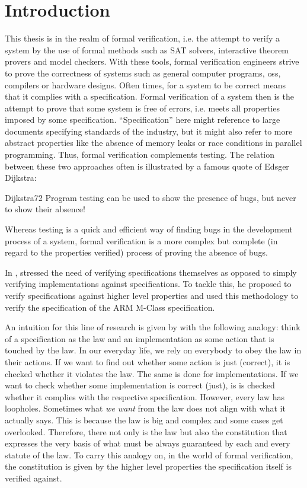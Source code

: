 
\chapter{Introduction}
\label{chp:introduction}

This thesis is in the realm of formal verification, i.e. the attempt to verify a system by the use of formal methods such as SAT solvers, interactive theorem provers and model checkers.
With these tools, formal verification engineers strive to prove the correctness of systems such as general computer programs, \glspl{os}, compilers or hardware designs.
Often times, for a system to be correct means that it complies with a specification.
Formal verification of a system then is the attempt to prove that some system is free of errors, i.e. meets all properties imposed by some specification.
\enquote{Specification} here might reference to large documents specifying standards of the industry, but it might also refer to more abstract properties like the absence of memory leaks or race conditions in parallel programming.
Thus, formal verification complements testing.
The relation between these two approaches often is illustrated by a famous quote of Edsger Dijkstra:
\begin{displaycquote}[p.6]{Dijkstra72}
    Program testing can be used to show the presence of bugs, but never to show their absence!
\end{displaycquote}

Whereas testing is a quick and efficient way of finding bugs in the development process of a system, formal verification is a more complex but complete (in regard to the properties verified) process of proving the absence of bugs.

In  \cite{Reid17}, \citeauthor{Reid17} stressed the need of verifying specifications themselves as opposed to simply verifying implementations against specifications.
To tackle this, he proposed to verify specifications against higher level properties and used this methodology to verify the specification of the ARM M-Class specification.

An intuition for this line of research is given by \citeauthor{Reid17} with the following analogy: think of a specification as the law and an implementation as some action that is touched by the law.
In our everyday life, we rely on everybody to obey the law in their actions.
If we want to find out whether some action is just (correct), it is checked whether it violates the law.
The same is done for implementations.
If we want to check whether some implementation is correct (just), is is checked whether it complies with the respective specification.
However, every law has loopholes.
Sometimes what \textit{we want} from the law does not align with what it actually says.
This is because the law is big and complex and some cases get overlooked.
Therefore, there not only is the law but also the constitution that expresses the very basis of what must be always guaranteed by each and every statute of the law.
To carry this analogy on, in the world of formal verification, the constitution is given by the higher level properties the specification itself is verified against.


